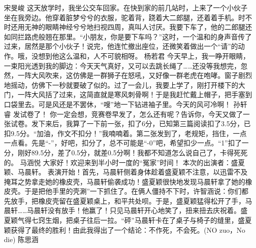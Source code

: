 {}\markdownRendererInterblockSeparator
{}宋旻峻\markdownRendererInterblockSeparator
{}这天放学时，我坐公交车回家。在快到家的前几站时，上来了一个小伙子坐在我旁边。他穿着脏梦兮兮的衣服，驼着背，跷着大二郎腿，还着着手机。时不时还用无神的眼睛神经兮兮地扫视四周，真叫人讨厌。我要下车了，他的二郎腿还如同拦路虎般翘在那里。“小朋友，你是要下车吗？”这时，一个温和的身声音传了过来，居然是那个小伙子！说完，他连忙撤出座位，还微笑着做出一个“请”的动作。哦，没想到他这么温和，人不可貌相呀。\markdownRendererInterblockSeparator
{}\markdownRendererInterblockSeparator
{}杨若君\markdownRendererInterblockSeparator
{}今天早上，我一睁开眼睛，一束阳光透到我的脚边：今天天气真好，又可以去跳长绳了……还没等我想完，忽然，一阵大风吹来，这仿佛是一群狮子在怒吼，又好像一群老虎在咆哮。窗子剧烈地摇动，仿佛下一秒就要破了似的。过了一会儿，我要上学了，刚打开楼下的大门，一阵大风括了过来，这简直就是寒风刺骨啊！于是我赶忙戴上帽子，把手塞到口袋里去。可是风还是不罢休，“嗖”地一下钻进袖子里。今天的风可冷啊！ \markdownRendererInterblockSeparator
{}\markdownRendererInterblockSeparator
{}孙轩睿\markdownRendererInterblockSeparator
{}发试卷了！\markdownRendererInterblockSeparator
{}你一定会想，竞赛卷早发了，怎么还有呢？告诉你，今天又做了一张试卷。发下来后，我算了一下前一张，扣了6分，已知第三篇阅读扣了3.5分，已扣9.5分。“加油，作文不扣分！”我喃喃着。第二张发到了，老规矩，挡住，一点一点看。先是“-”，好吧，扣分了，总不可能是“-0”吧，希望扣少一点。“1”扣了一分，刚好89.5分，差了0.5分，就差0.5分啊！我都不知道怎么说自己了，卡得死死的。\markdownRendererInterblockSeparator
{}\markdownRendererInterblockSeparator
{}马涵悦\markdownRendererInterblockSeparator
{}大家好！欢迎来到半小时一度的“冤家”时间！\markdownRendererInterblockSeparator
{}本次的出演者：盛夏颖、马晨轩。\markdownRendererInterblockSeparator
{}表演开始！首先，马晨轩侧着身体趁着盛夏颖不注意，以迅雷不及掩耳之势拿走她的橡皮壳，马晨轩偷袭成功！盛夏颖很快地发现马晨轩拿了她的橡皮壳。于是把他手里的壳涮”一下抓住了。在俩人僵持不下时，许智涵说：你们都先放手，把橡皮壳留在盛夏颖桌上，和平共处呗。于是，盛夏颖猛得松开了手，马晨轩……马晨轩没有放手！他赢了！只见马晨轩开心地笑了，扭来扭去庆祝着。盛夏颖气得七窍生烟，把桌子往后一拉。“砰”马晨轩卡在了桌子与椅子的缝里，盛夏颖获得了最终的胜利！由此我得出了一个结论：不作死，不会死。(NO zuo，No die)\markdownRendererInterblockSeparator
{}\markdownRendererInterblockSeparator
{}陈思涵\markdownRendererInterblockSeparator
